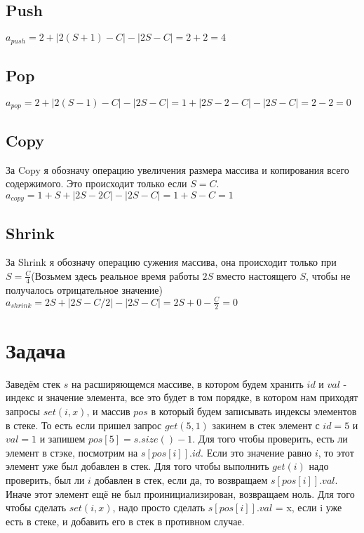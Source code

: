 \documentclass{article}
\begin{document}
\subsection*{Push}
$a_{push} = 2 + |2(S + 1) - C| - |2S - C| = 2 + 2 = 4$
\subsection*{Pop}
$a_{pop} = 2 + |2(S - 1) - C| - |2S - C| = 1 + |2S - 2 - C| - |2S - C| = 2 - 2 = 0$
\subsection*{Copy}
За Copy я обозначу операцию увеличения размера массива и копирования всего содержимого. Это происходит только если $S = C$.
\newline
$a_{copy} = 1 + S + |2S - 2C| - |2S - C| = 1 + S - C = 1$
\subsection*{Shrink}
За Shrink я обозначу операцию сужения массива, она происходит только при $S = \frac{C}{4}$(Возьмем здесь реальное время работы $2S$ вместо настоящего $S$, чтобы не получалось отрицательное значение)
\newline
$a_{shrink} = 2S + |2S - C / 2| - |2S - C| = 2S + 0 - \frac{C}{2} = 0$
\section*{Задача }
Заведём стек $s$ на расширяющемся массиве, в котором будем хранить $id$ и $val$ - индекс и значение элемента, все это будет в том порядке, в котором нам приходят запросы $set(i, x)$, и массив $pos$ в который будем записывать индексы элементов в стеке. То есть если пришел запрос $get(5, 1)$ закинем в стек элемент с $id = 5$ и $val = 1$ и запишем $pos[5] = s.size() - 1$.
\newline
Для того чтобы проверить, есть ли элемент в стэке, посмотрим  на $s[pos[i]].id$. Если это значение равно $i$, то этот элемент уже был добавлен в стек.
\newline
 Для того чтобы выполнить $get(i)$ надо проверить, был ли $i$ добавлен в стек, если да, то возвращаем $s[pos[i]].val$. Иначе этот элемент ещё не был проинициализирован, возвращаем ноль. 
 \newline
 Для того чтобы сделать $set(i, x)$, надо просто сделать $s[pos[i]].val$ = x, если i уже есть в стеке, и добавить его в стек в противном случае. 
\end{document}

